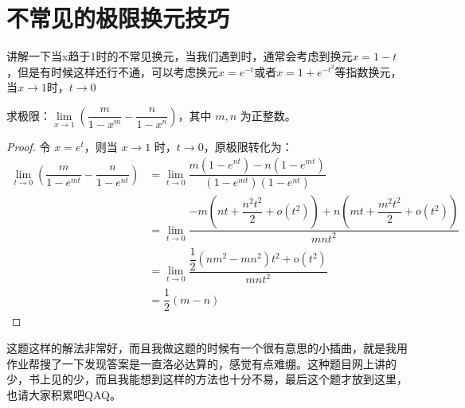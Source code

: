 \section{不常见的极限换元技巧}
讲解一下当x趋于1时的不常见换元，当我们遇到时，通常会考虑到换元\(x=1-t\)，但是有时候这样还行不通，可以考虑换元\(x=e^{-t}\)或者\(x=1+e^{-t^2}\)等指数换元，当\(x\to 1\)时，\(t\to 0\)

\begin{example}
求极限：\(\lim\limits_{x \to 1}\left( \dfrac{m}{1 - x^m} - \dfrac{n}{1 - x^n} \right)\)，其中 \(m,n\) 为正整数。

\end{example}

\begin{proof}
令 \(x = e^t\)，则当 \(x \to 1\) 时，\(t \to 0\)，原极限转化为：
\begin{align*}
\lim\limits_{t \to 0}\left( \dfrac{m}{1 - e^{mt}} - \dfrac{n}{1 - e^{nt}} \right)
&= \lim\limits_{t \to 0}\dfrac{m(1 - e^{nt}) - n(1 - e^{mt})}{(1 - e^{mt})(1 - e^{nt})}\\
&= \lim\limits_{t \to 0}\dfrac{-m\left( nt + \dfrac{n^2t^2}{2} + o(t^2) \right) + n\left( mt + \dfrac{m^2t^2}{2} + o(t^2) \right)}{mnt^2}\\
&= \lim\limits_{t \to 0}\dfrac{\dfrac{1}{2}(nm^2 - mn^2)t^2 + o(t^2)}{mnt^2}\\
&= \dfrac{1}{2}(m - n)
\end{align*}
\end{proof}

\begin{remark}
这题这样的解法非常好，而且我做这题的时候有一个很有意思的小插曲，就是我用作业帮搜了一下发现答案是一直洛必达算的，感觉有点难绷。这种题目网上讲的少，书上见的少，而且我能想到这样的方法也十分不易，最后这个题才放到这里，也请大家积累吧QAQ。
\end{remark}



